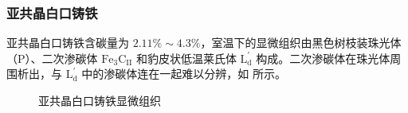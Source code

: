     \subsubsection{亚共晶白口铸铁}
    亚共晶白口铸铁含碳量为 $2.11\%\sim 4.3\%$，室温下的显微组织由黑色树枝装珠光体（P）、二次渗碳体 $\text{Fe}_3\text{C}_\text{II}$ 和豹皮状低温莱氏体 $\text{L}_\text{d}^{'}$ 构成。二次渗碳体在珠光体周围析出，与 $\text{L}_\text{d}^{'}$ 中的渗碳体连在一起难以分辨，如 所示。
    \begin{figure}[!ht]
        \hspace{20pt}
        \hspace{20pt}
        \caption{亚共晶白口铸铁显微组织\label{fig:n5}}
    \end{figure}

